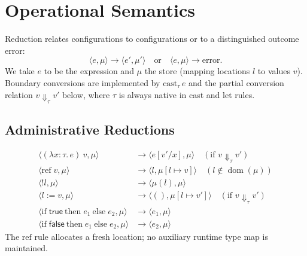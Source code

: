 \documentclass[11pt,a4paper]{article}
\begin{document}
\section{Operational Semantics}
\label{sec:opsem}

Reduction relates configurations to configurations or to a distinguished outcome $\text{error}$:
\[
  \langle e, \mu \rangle \to \langle e', \mu' \rangle
  \quad\text{or}\quad
  \langle e, \mu \rangle \to \text{error}.
\]
We take $e$ to be the expression and $\mu$ the store (mapping locations $l$ to values $v$).
Boundary conversions are implemented by $\text{cast}_{\tau}\, e$ and the partial conversion relation $v \Downarrow_{\tau} v'$ below, where $\tau$ is always native in cast and let rules.

\subsection{Administrative Reductions}
\[
\begin{aligned}
  \langle (\lambda x{:}\tau.\, e)\ v, \mu \rangle &\to \langle e[v'/x], \mu \rangle \quad (\text{if } v \Downarrow_{\tau} v') \\
  \langle \text{ref}\; v, \mu \rangle &\to \langle l, \mu[l \mapsto v] \rangle \quad (l \notin \operatorname{dom}(\mu)) \\
  \langle {!}l, \mu \rangle &\to \langle \mu(l), \mu \rangle \\
  \langle l \mathrel{:=} v, \mu \rangle &\to \langle (), \mu[l \mapsto v'] \rangle \quad (\text{if } v \Downarrow_{\tau} v') \\
  \langle \text{if}\; \textsf{true}\ \text{then}\; e_1\ \text{else}\; e_2, \mu \rangle &\to \langle e_1, \mu \rangle \\
  \langle \text{if}\; \textsf{false}\ \text{then}\; e_1\ \text{else}\; e_2, \mu \rangle &\to \langle e_2, \mu \rangle
\end{aligned}
\]
The $\text{ref}$ rule allocates a fresh location; no auxiliary runtime type map is maintained.
\end{document}
